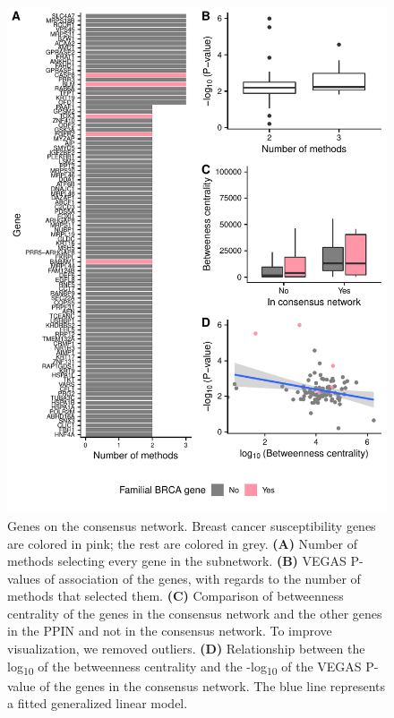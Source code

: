 \documentclass[
  11pt,
]{env/yjiao}
\begin{document}
\begin{figure}

{\centering \includegraphics[height=0.75\textheight]{fig/sfigure_8} 

}

\caption{Genes on the consensus network. Breast cancer susceptibility genes are colored in pink; the rest are colored in grey. \textbf{(A)} Number of methods selecting every gene in the subnetwork. \textbf{(B)} VEGAS P-values of association of the genes, with regards to the number of methods that selected them. \textbf{(C)} Comparison of betweenness centrality of the genes in the consensus network and the other genes in the PPIN and not in the consensus network. To improve visualization, we removed outliers. \textbf{(D)} Relationship between the log\textsubscript{10} of the betweenness centrality and the -log\textsubscript{10} of the VEGAS P-value of the genes in the consensus network. The blue line represents a fitted generalized linear model.}\label{fig:consensus-stats}
\end{figure}
\end{document}
